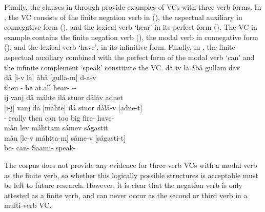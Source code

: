 Finally, the clauses in  through  provide examples of VCs with three verb forms. In , the VC consists of the finite negation verb in  (), the aspectual auxiliary  in connegative form (), and the lexical verb  ‘hear’ in its perfect form (). The VC in example  contains the finite negation verb  (), the modal verb  in connegative form (), and the lexical verb  ‘have’, in its infinitive form. Finally, in , the finite aspectual auxiliary  combined with the perfect form of the modal verb  ‘can’ and the infinite complement  ‘speak’ constitute the VC.
\ea\label{VCex6}
\glll	dä iv lä åbå gullam dav\\
	dä [i-v {lä]\subVC} åbå {[gulla-m]\subVC} d-a-v\\
	then - be\BS{} at.all hear- --\\\nopagebreak
{}	
\z
\ea\label{VCex7}
\glll	ij vanj dä máhte ilá stuor dålåv adnet\\
	{[i-j]\subVC} vanj dä {[máhte]\subVC} ilá stuor dålå-v {[adne-t]\subVC}\\
	- really then can\BS{} too big fire- have-\\\nopagebreak
{}	
\z
\ea\label{VCex8}
\glll	mån lev máhttam sámev ságastit\\
	mån {[le-v} {máhtta-m]\subVC} sáme-v {[ságasti-t]\subVC}\\
	 be- can- Saami- speak-\\\nopagebreak
{}	
\z


The corpus does not provide any evidence for three-verb VCs with a modal verb as the finite verb, so whether this logically possible structures is acceptable 
must be left to future research. However, it is clear that the negation verb is only attested as a finite verb, and can never occur as the second or third verb in a multi-verb VC. 



